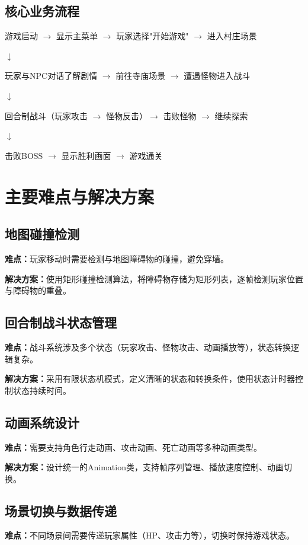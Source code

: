 \documentclass[a4paper,12pt]{article}
\begin{document}
\subsection{核心业务流程}
游戏启动 $\rightarrow$ 显示主菜单 $\rightarrow$ 玩家选择"开始游戏" $\rightarrow$ 进入村庄场景

$\downarrow$

玩家与NPC对话了解剧情 $\rightarrow$ 前往寺庙场景 $\rightarrow$ 遭遇怪物进入战斗

$\downarrow$

回合制战斗（玩家攻击 $\rightarrow$ 怪物反击）$\rightarrow$ 击败怪物 $\rightarrow$ 继续探索

$\downarrow$

击败BOSS $\rightarrow$ 显示胜利画面 $\rightarrow$ 游戏通关

\section{主要难点与解决方案}

\subsection{地图碰撞检测}
\textbf{难点：}玩家移动时需要检测与地图障碍物的碰撞，避免穿墙。

\textbf{解决方案：}使用矩形碰撞检测算法，将障碍物存储为矩形列表，逐帧检测玩家位置与障碍物的重叠。

\subsection{回合制战斗状态管理}
\textbf{难点：}战斗系统涉及多个状态（玩家攻击、怪物攻击、动画播放等），状态转换逻辑复杂。

\textbf{解决方案：}采用有限状态机模式，定义清晰的状态和转换条件，使用状态计时器控制状态持续时间。

\subsection{动画系统设计}
\textbf{难点：}需要支持角色行走动画、攻击动画、死亡动画等多种动画类型。

\textbf{解决方案：}设计统一的Animation类，支持帧序列管理、播放速度控制、动画切换。

\subsection{场景切换与数据传递}
\textbf{难点：}不同场景间需要传递玩家属性（HP、攻击力等），切换时保持游戏状态。
\end{document}
